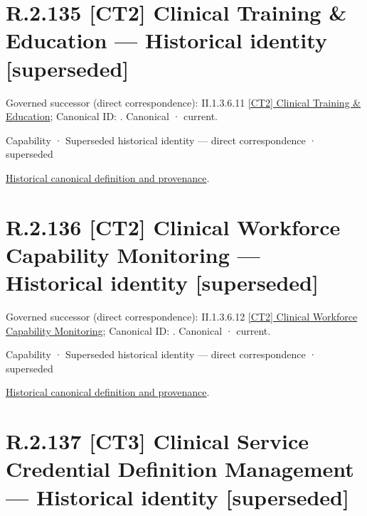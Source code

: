 \section*{R.2.135 [CT2] Clinical Training \& Education — Historical identity [superseded]}
\label{navigation:R.2.135}

{\small Governed successor (direct correspondence): II.1.3.6.11 \hyperref[element:d016f35ffbc345d99d7281e968c14ddb]{[CT2] Clinical Training \& Education}; Canonical ID: \texttt{}. Canonical · current.}\par
\label{element:df8bff7df9c1469da16cac6a5eb2bf76}
{\small Capability · Superseded historical identity — direct correspondence · superseded}\par
\href{../../../../continuum/strategy/capability/df8bff7df9c1469da16cac6a5eb2bf76.md}{Historical canonical definition and provenance}.\par
\section*{R.2.136 [CT2] Clinical Workforce Capability Monitoring — Historical identity [superseded]}
\label{navigation:R.2.136}

{\small Governed successor (direct correspondence): II.1.3.6.12 \hyperref[element:367b3e5643f44fa785f093db8bb9a6e8]{[CT2] Clinical Workforce Capability Monitoring}; Canonical ID: \texttt{}. Canonical · current.}\par
\label{element:24c015676c254e2e82e8e4287c295179}
{\small Capability · Superseded historical identity — direct correspondence · superseded}\par
\href{../../../../continuum/strategy/capability/24c015676c254e2e82e8e4287c295179.md}{Historical canonical definition and provenance}.\par
\section*{R.2.137 [CT3] Clinical Service Credential Definition Management — Historical identity [superseded]}
\label{navigation:R.2.137}

